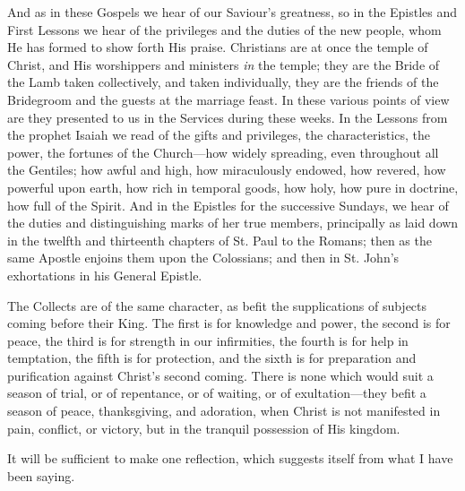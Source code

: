 And as in these Gospels we hear of our Saviour's greatness, so in
the Epistles and First Lessons we hear of the privileges and the
duties of the new people, whom He has formed to show forth His praise.
Christians are at once the temple of Christ, and His worshippers and
ministers \emph{in} the temple; they are the Bride of the Lamb taken
collectively, and taken individually, they are the friends of the
Bridegroom and the guests at the marriage feast. In these various
points of view are they presented to us in the Services during these
weeks. In the Lessons from the prophet Isaiah we read of the gifts and
privileges, the characteristics, the power, the fortunes of the Church—how
widely spreading, even throughout all the Gentiles; how awful and
high, how miraculously endowed, how revered, how powerful upon earth,
how rich in temporal goods, how holy, how pure in doctrine, how full
of the Spirit. And in the Epistles for the successive Sundays, we hear
of the duties and distinguishing marks of her true members,
principally as laid down in the twelfth and thirteenth chapters of St.
Paul to the Romans; then as the same Apostle enjoins them upon the
Colossians; and then in St. John's exhortations in his General
Epistle.

The Collects are of the same character, as befit the supplications
of subjects coming before their King. The first is for knowledge and
power, the second is for peace, the third is for strength in our
infirmities, the fourth is for help in temptation, the fifth is for
protection, and the sixth is for preparation and purification against
Christ's second coming. There is none which would suit a season of
trial, or of repentance, or of waiting, or of exultation—they befit
a season of peace, thanksgiving, and adoration, when Christ is not
manifested in pain, conflict, or victory, but in the tranquil
possession of His kingdom.

It will be sufficient to make one reflection, which suggests itself
from what I have been saying.

